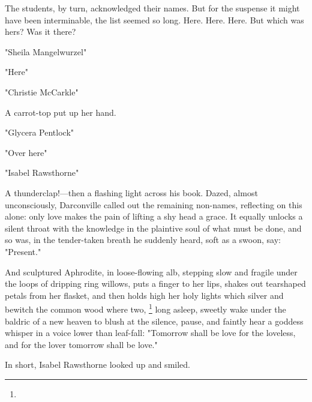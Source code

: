   The students, by turn, acknowledged their names. But for the suspense it might
have been interminable, the list seemed so long. Here. Here. Here. But which was
hers? Was it there?

  "Sheila Mangelwurzel"

  "Here"

  "Christie McCarkle"

  A carrot-top put up her hand.

  "Glycera Pentlock"

  "Over here"

  "Isabel Rawsthorne"

  A thunderclap!---then a flashing light across his book. Dazed, almost
unconsciously, Darconville called out the remaining non-names, reflecting on
this alone: only love makes the pain of lifting a shy head a grace. It equally
unlocks a silent throat with the knowledge in the plaintive 
soul of what must be done, and so was, in the tender-taken breath he suddenly 
heard, soft as a swoon,
say: "Present."

  And sculptured Aphrodite, in loose-flowing alb,
stepping slow and fragile under the loops of dripping ring willows, 
puts a finger to her lips, shakes out tearshaped petals 
from her flasket, 
and then holds high her holy lights which silver 
and bewitch the common wood where two, 
\footnote{\textdbend}
long asleep, sweetly wake under the baldric 
of a new heaven to blush at the silence, pause, and faintly hear a
goddess whisper in a voice lower than leaf-fall: "Tomorrow shall be love for the
loveless, and for the lover tomorrow shall be love."

  In short, Isabel Rawsthorne looked up and smiled.
 
